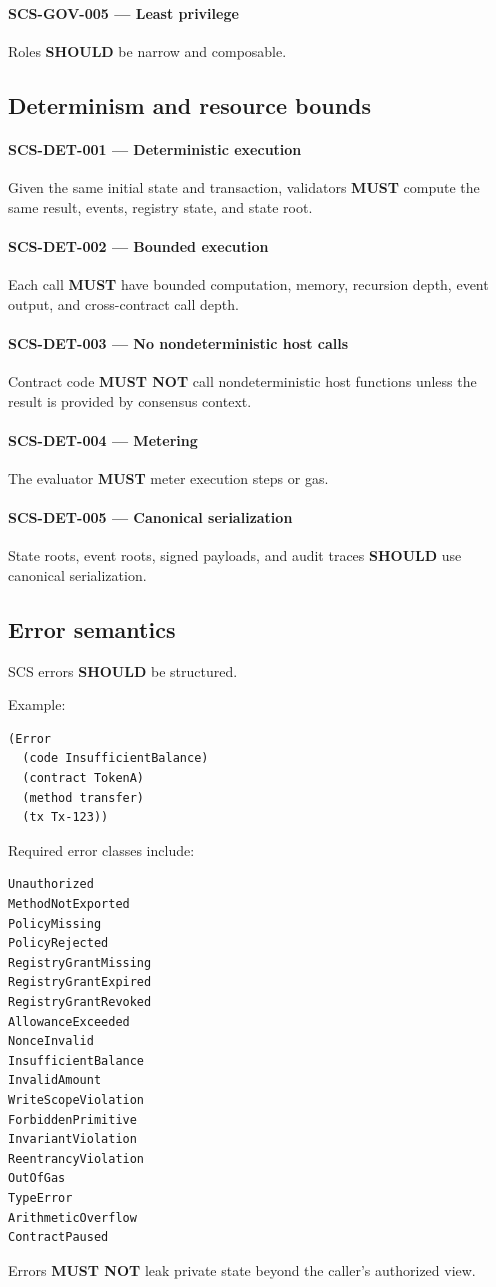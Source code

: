 \documentclass[11pt]{article}
\newcommand{\SCS}{\textsc{SCS}}
\newcommand{\MUST}{\textbf{MUST}}
\newcommand{\MUSTNOT}{\textbf{MUST NOT}}
\newcommand{\SHOULD}{\textbf{SHOULD}}
\newcommand{\req}[2]{\paragraph{#1}#2\par}
\begin{document}
\req{SCS-GOV-005 --- Least privilege}{Roles \SHOULD{} be narrow and composable.}

\subsection{Determinism and resource bounds}

\req{SCS-DET-001 --- Deterministic execution}{Given the same initial state and transaction, validators \MUST{} compute the same result, events, registry state, and state root.}

\req{SCS-DET-002 --- Bounded execution}{Each call \MUST{} have bounded computation, memory, recursion depth, event output, and cross-contract call depth.}

\req{SCS-DET-003 --- No nondeterministic host calls}{Contract code \MUSTNOT{} call nondeterministic host functions unless the result is provided by consensus context.}

\req{SCS-DET-004 --- Metering}{The evaluator \MUST{} meter execution steps or gas.}

\req{SCS-DET-005 --- Canonical serialization}{State roots, event roots, signed payloads, and audit traces \SHOULD{} use canonical serialization.}

\subsection{Error semantics}

\SCS{} errors \SHOULD{} be structured.

Example:

\begin{lstlisting}
(Error
  (code InsufficientBalance)
  (contract TokenA)
  (method transfer)
  (tx Tx-123))
\end{lstlisting}

Required error classes include:

\begin{lstlisting}
Unauthorized
MethodNotExported
PolicyMissing
PolicyRejected
RegistryGrantMissing
RegistryGrantExpired
RegistryGrantRevoked
AllowanceExceeded
NonceInvalid
InsufficientBalance
InvalidAmount
WriteScopeViolation
ForbiddenPrimitive
InvariantViolation
ReentrancyViolation
OutOfGas
TypeError
ArithmeticOverflow
ContractPaused
\end{lstlisting}

Errors \MUSTNOT{} leak private state beyond the caller's authorized view.
\end{document}
